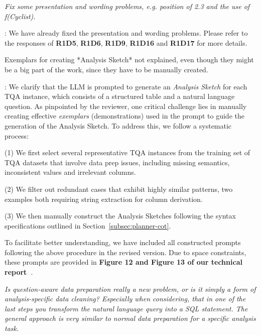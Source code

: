 
\begin{shaded}
{
\emph{Fix some presentation and wording problems, e.g. position of 2.3 and the use of f(Cyclist).}
}
\end{shaded}
: 
We have already fixed the presentation and wording problems. Please refer to the responses of \textbf{R1D5}, \textbf{R1D6}, \textbf{R1D9}, \textbf{R1D16} and \textbf{R1D17} for more details.

\begin{shaded}
{
 Exemplars for creating *Analysis Sketch* not explained, even though they might be a big part of the work, since they have to be manually created.
}
\end{shaded}

: 
We clarify that the LLM is prompted to generate an \emph{Analysis Sketch} for each TQA instance, which consists of a structured table and a natural language question.  
As pinpointed by the reviewer, one critical challenge lies in manually creating effective \emph{exemplars} (\ie demonstrations) used in the prompt to guide the generation of the Analysis Sketch. To address this, we follow a systematic process: 

(1) We first select several representative TQA instances from the training set of TQA datasets that involve data prep issues, including missing semantics, inconsistent values and irrelevant columns.  

(2) We filter out redundant cases that exhibit highly similar patterns, \eg two examples both requiring string extraction for column derivation. 

(3) We then manually construct the Analysis Sketches following the syntax specifications outlined in Section~\ref{subsec:planner-cot}.  

To facilitate better understanding, we have included all constructed prompts following the above procedure in the revised version. Due to space constraints, these prompts are provided in
\textbf{
Figure 12 and Figure 13
of our technical report~\cite{technical_report}}.

\begin{shaded}
{
\emph{Is question-aware data preparation really a new problem, or is it simply a form of analysis-specific data cleaning? Especially when considering, that in one of the last steps you transform the natural language query into a SQL statement. The general approach is very similar to normal data preparation for a specific analysis task. }
}
\end{shaded}

